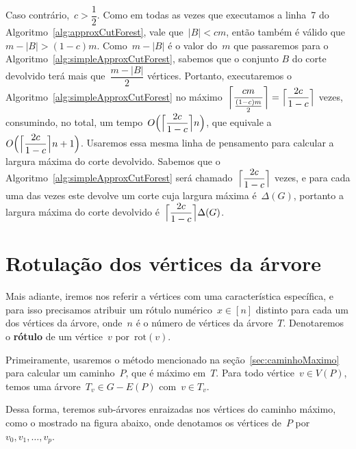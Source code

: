 \documentclass[a4paper,12pt]{article}
\DeclarePairedDelimiter\ceil{\lceil}{\rceil}
\newcommand{\rot}{\mathrm{rot}}
\begin{document}
	Caso contrário,~${c>\dfrac{1}{2}}$. Como em todas as vezes que
	executamos a linha~7 do Algoritmo~\ref{alg:approxCutForest}, 
	vale que~${|B|<cm}$, então também é válido que~${m-|B|>(1-c)m}$.
	Como~${m-|B|}$ é o valor do~$m$ que passaremos para o 
	Algoritmo~\ref{alg:simpleApproxCutForest}, sabemos que o 
	conjunto $B$ do corte devolvido terá mais 
	que~$\dfrac{m-|B|}{2}$ vértices.
	Portanto, executaremos o 
	Algoritmo~\ref{alg:simpleApproxCutForest} no 
	máximo~${\ceil[\bigg]{\dfrac{cm}{\frac{(1-c)m}{2}}} 
	=\ceil[\Big]{\dfrac{2c}{1-c}}}$ vezes, consumindo, no total, um
	tempo~$O\Big(\ceil[\Big]{ \dfrac{2c}{1-c}} n\Big)$,
	que equivale a~$O\Big(\ceil[\Big]{ \dfrac{2c}{1-c}} n+1\Big)$.
	Usaremos essa mesma linha de pensamento para calcular a largura
	máxima do corte devolvido. Sabemos que o 
	Algoritmo~\ref{alg:simpleApproxCutForest} será 
	chamado~$\ceil[\Big]{\dfrac{2c}{1-c}}$ vezes, e para cada uma 
	das vezes este devolve um corte cuja largura 
	máxima é~$\Delta(G)$, portanto a largura máxima do corte 
	devolvido é~$\ceil[\Big]{\dfrac{2c}{1-c}}\Delta(G)$.







\newpage

\section {Rotulação dos vértices da árvore}

	Mais adiante, iremos nos referir a vértices com uma 
	característica específica, e para isso precisamos atribuir um 
	rótulo numérico~$x\in [n]$ distinto para cada um dos vértices 
	da árvore, onde~$n$ é o número de vértices da árvore~$T$. 
	Denotaremos o \textbf{rótulo} de um vértice~$v$ por~$\rot(v)$.

	Primeiramente, usaremos o método mencionado na 
	seção~\ref{sec:caminhoMaximo} para calcular 
	um caminho~$P$, que é máximo em~$T$. 
	Para todo vértice~$v\in V(P)$, temos uma 
	árvore~$T_v \in G - E(P)$ com~$v\in T_v$.

	Dessa forma, teremos sub-árvores enraizadas nos vértices do
	caminho máximo, como o mostrado na figura abaixo, onde denotamos
	os vértices de~$P$ por~${v_0,v_1,\ldots,v_p}$.
	
\end{document}
